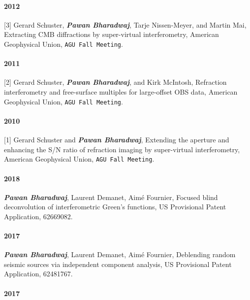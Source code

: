 \documentclass[9pt]{developercv} %
\begin{document}
\paragraph{2012}\label{section-38}

{[}3{]}
Gerard
Schuster,
\textbf{\emph{Pawan
Bharadwaj}},
Tarje
Nissen-Meyer,
and Martin
Mai,
Extracting
CMB
diffractions
by
super-virtual
interferometry,
American
Geophysical
Union,
\texttt{AGU\ Fall\ Meeting}.

\paragraph{2011}\label{section-39}

{[}2{]}
Gerard
Schuster,
\textbf{\emph{Pawan
Bharadwaj}},
and Kirk
McIntosh,
Refraction
interferometry
and
free-surface
multiples
for
large-offset
OBS data,
American
Geophysical
Union,
\texttt{AGU\ Fall\ Meeting}.

\paragraph{2010}\label{section-40}

{[}1{]}
Gerard
Schuster
and
\textbf{\emph{Pawan
Bharadwaj}},
Extending
the
aperture
and
enhancing
the S/N
ratio of
refraction
imaging by
super-virtual
interferometry,
American
Geophysical
Union,
\texttt{AGU\ Fall\ Meeting}.

\label{patents}

\paragraph{2018}\label{section-41}

\textbf{\emph{Pawan
Bharadwaj}},
Laurent
Demanet,
Aimé
Fournier,
Focused
blind
deconvolution
of
interferometric
Green's
functions,
US
Provisional
Patent
Application,
62669082.

\paragraph{2017}\label{section-42}

\textbf{\emph{Pawan
Bharadwaj}},
Laurent
Demanet,
Aimé
Fournier,
Deblending
random
seismic
sources
via
independent
component
analysis,
US
Provisional
Patent
Application,
62481767.

\label{arxiv.org}

\paragraph{2017}\label{section-43}
\end{document}
